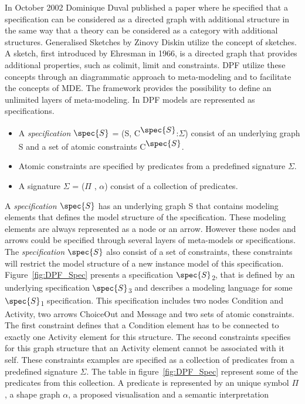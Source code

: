 In October 2002 Dominique Duval published a paper where he specified that a
specification can be considered as a directed graph with additional structure
in the same way that a theory can be considered as a category with additional
structures\cite{Duval2003}. Generalised Sketches by Zinovy Diskin utilize the
concept of sketches. A sketch, first introduced by Ehresman in 1966, is a
directed graph that provides additional properties, such as colimit, limit and
constraints. DPF utilize these concepts through an diagrammatic approach to
meta-modeling and to facilitate the concepts of MDE. The framework provides the
possibility to define an unlimited layers of meta-modeling. In DPF models are
represented as specifications.

\begin{itemize}
  
\item A \emph{specification $\spec{S}$} = (S,
C\textsuperscript{$\spec{S}$}:$\Sigma$) consist of an underlying graph S and a
set of atomic constraints C\textsuperscript{$\spec{S}$}. 

\item Atomic constraints are specified by predicates from a predefined signature
$\Sigma$.

\item A signature $\Sigma$ = ($\Pi$ \hspace{1 mm}, \hspace{1 mm}$\alpha$)
consist of a collection of predicates. 
  
\end{itemize}

A \emph{specification $\spec{S}$} has an underlying graph S that contains
modeling elements that defines the model structure of the specification. These
modeling elements are always represented as a node or an arrow. However these
nodes and arrows could be specified through several layers of
meta-models or specifications. The \emph{specification $\spec{S}$} also consist
of a set of constraints, these constraints will restrict the model structure of
a new instance model of this specification. Figure~\ref{fig:DPF_Spec} presents a
specification $\spec{S}$\textsubscript{2}, that is defined by an underlying
specification $\spec{S}$\textsubscript{3} and describes a modeling language for
some $\spec{S}$\textsubscript{1} specification. This specification includes two
nodes Condition and Activity, two arrows ChoiceOut and Message and  two sets of
atomic constraints. The first constraint defines that a Condition element has
to be connected to exactly one Activity element for this structure. The second
constraints specifies for this graph structure that an Activity element cannot
be associated with it self. These constraints examples are specified as a
collection of predicates from a predefined signature $\Sigma$. The table in
figure~\ref{fig:DPF_Spec} represent some of the predicates from this
collection. A predicate is represented by an unique symbol $\Pi$, a shape graph
$\alpha$, a proposed visualisation and a semantic interpretation

